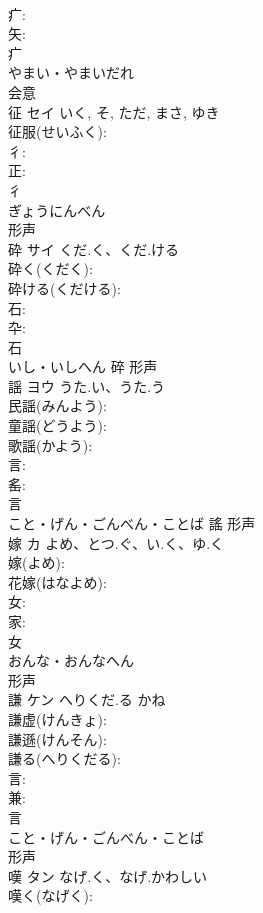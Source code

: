 \documentclass[8pt]{extreport}
\begin{document}
\begin{CJK}{UTF8}{min}
\\	疒: 
\\	矢: 
\\	疒	
\\	やまい・やまいだれ	
\\	会意 
\\	征	セイ		いく, そ, ただ, まさ, ゆき	
\\	征服(せいふく): 
\\	彳: 
\\	正: 
\\	彳	
\\	ぎょうにんべん	
\\	形声 
\\	砕	サイ	くだ.く、くだ.ける		
\\	砕く(くだく): 
\\	砕ける(くだける): 
\\	石: 
\\	卆: 
\\	石	
\\	いし・いしへん	碎	形声 
\\	謡	ヨウ	うた.い、うた.う		
\\	民謡(みんよう): 
\\	童謡(どうよう): 
\\	歌謡(かよう): 
\\	言: 
\\	䍃: 
\\	言	
\\	こと・げん・ごんべん・ことば	謠	形声 
\\	嫁	カ	よめ、とつ.ぐ、い.く、ゆ.く		
\\	嫁(よめ): 
\\	花嫁(はなよめ): 
\\	女: 
\\	家: 
\\	女	
\\	おんな・おんなへん	
\\	形声 
\\	謙	ケン	へりくだ.る	かね	
\\	謙虚(けんきょ): 
\\	謙遜(けんそん): 
\\	謙る(へりくだる): 
\\	言: 
\\	兼: 
\\	言	
\\	こと・げん・ごんべん・ことば	
\\	形声 
\\	嘆	タン	なげ.く、なげ.かわしい		
\\	嘆く(なげく): 

\end{CJK}
\end{document}
